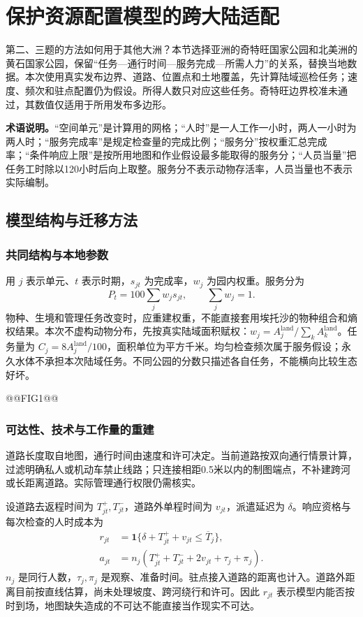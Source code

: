 \documentclass[UTF8,fontset=fandol,12pt,a4paper]{ctexart}
\begin{document}
\section{保护资源配置模型的跨大陆适配}

第二、三题的方法如何用于其他大洲？本节选择亚洲的奇特旺国家公园和北美洲的黄石国家公园，保留“任务—通行时间—服务完成—所需人力”的关系，替换当地数据。本次使用真实发布边界、道路、位置点和土地覆盖，先计算陆域巡检任务；速度、频次和驻点配置仍为假设。所得人数只对应这些任务。奇特旺边界校准未通过，其数值仅适用于所用发布多边形。

\textbf{术语说明。}“空间单元”是计算用的网格；“人时”是一人工作一小时，两人一小时为两人时；“服务完成率”是规定检查量的完成比例；“服务分”按权重汇总完成率；“条件响应上限”是按所用地图和作业假设最多能取得的服务分；“人员当量”把任务工时除以120小时后向上取整。服务分不表示动物存活率，人员当量也不表示实际编制。

\subsection{模型结构与迁移方法}
\subsubsection{共同结构与本地参数}

用 \(j\) 表示单元、\(t\) 表示时期，\(s_{jt}\) 为完成率，\(w_j\) 为园内权重。服务分为
\begin{equation}
P_t=100\sum_jw_js_{jt},\qquad \sum_jw_j=1.
\label{eq:q6score}
\end{equation}
物种、生境和管理任务改变时，应重建权重，不能直接套用埃托沙的物种组合和熵权结果。本次不虚构动物分布，先按真实陆域面积赋权：\(w_j=A_j^{\mathrm{land}}/\sum_kA_k^{\mathrm{land}}\)。任务量为 \(C_j=8A_j^{\mathrm{land}}/100\)，面积单位为平方千米。均匀检查频次属于服务假设；永久水体不承担本次陆域任务。不同公园的分数只描述各自任务，不能横向比较生态好坏。

@@FIG1@@

\clearpage
\subsubsection{可达性、技术与工作量的重建}

道路长度取自地图，通行时间由速度和许可决定。当前道路按双向通行情景计算，过滤明确私人或机动车禁止线路；只连接相距0.5米以内的制图端点，不补建跨河或长距离道路。实际管理通行权限仍需核实。

设道路去返程时间为 \(T_{jt}^{+},T_{jt}^{-}\)，道路外单程时间为 \(v_{jt}\)，派遣延迟为 \(\delta\)。响应资格与每次检查的人时成本为
\begin{align}
r_{jt}&=\mathbf{1}\{\delta+T_{jt}^{+}+v_{jt}\leq\overline{T}_j\},\label{eq:q6response}\\
a_{jt}&=n_j(T_{jt}^{+}+T_{jt}^{-}+2v_{jt}+\tau_j+\pi_j).\label{eq:q6cost}
\end{align}
\(n_j\) 是同行人数，\(\tau_j,\pi_j\) 是观察、准备时间。驻点接入道路的距离也计入。道路外距离目前按直线估算，尚未处理坡度、跨河绕行和许可。因此 \(r_{jt}\) 表示模型内能否按时到场，地图缺失造成的不可达不能直接当作现实不可达。
\end{document}
